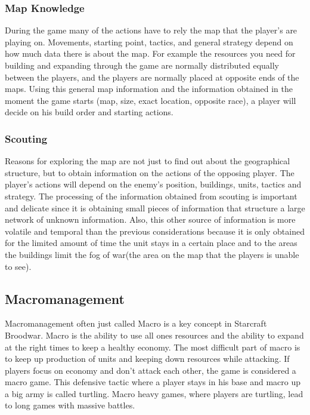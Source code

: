 			\subsubsection{Map Knowledge}
				During the game many of the actions have to rely the map that the player's are playing on. Movements, starting point, 
				tactics, and general strategy depend on how much data there is about the map. 				
				For example the resources you need for building and expanding through the game are normally distributed
				equally between the players, and the players are normally placed at opposite ends of the maps. 
				Using this general map information and the information obtained in the moment the game starts 
				(map, size, exact location, opposite race), a player will decide on his build order and starting actions. 
		
			\subsubsection{Scouting}
				Reasons for exploring the map are not just to find out about the geographical structure, 
				but to obtain information on the actions of the opposing player. The player's actions will depend on
				the enemy's position, buildings, units, tactics and strategy. The processing of the information 
				obtained from scouting is important and delicate since it is obtaining small pieces of information 
				that structure a large network of unknown information. Also, this other source of information 
				is more volatile and temporal than the previous considerations because it is only obtained for the 
				limited amount of time the unit stays in a certain place and to the areas the buildings limit the fog of war(the area on the map that the players is unable to see).
				
	\subsection{Macromanagement}
		Macromanagement often just called Macro is a key concept in Starcraft Broodwar. 
		Macro is the ability to use all ones resources and the ability to expand at the right times to keep a healthy economy.
		The most difficult part of macro is to keep up production of units and keeping down resources while attacking.
		If players focus on economy and don't attack each other, the game is considered a macro game. This defensive tactic where a
		player stays in his base and macro up a big army is called turtling. Macro heavy games, where players are turtling, lead to
		long games with massive battles. 
			

